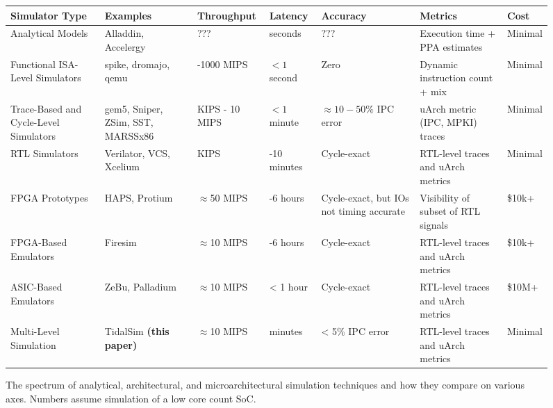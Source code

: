\documentclass[sigplan,nonacm,10pt]{acmart}
\begin{document}
\begin{figure}[!hbt]
  \small
  \begin{tabular}{>{\raggedright\arraybackslash}p{2.5cm}>{\raggedright\arraybackslash}p{2cm}>{\raggedright\arraybackslash}p{2cm}>{\raggedright\arraybackslash}p{2cm}>{\raggedright\arraybackslash}p{2.5cm}>{\raggedright\arraybackslash}p{3cm}>{\raggedright\arraybackslash}p{2cm}}\toprule
  \textbf{Simulator Type} & \textbf{Examples} & \textbf{Throughput} & \textbf{Latency} & \textbf{Accuracy} & \textbf{Metrics} & \textbf{Cost} \\\midrule
  Analytical Models & Alladdin, Accelergy & ??? & seconds & ??? & Execution time + PPA estimates & Minimal \\
  \midrule
  Functional ISA-Level Simulators & spike, dromajo, qemu & 100-1000 MIPS & $<1$ second & Zero & Dynamic instruction count + mix & Minimal \\
  \midrule
  Trace-Based and Cycle-Level Simulators & gem5, Sniper, ZSim, SST, MARSSx86 & 100 KIPS - 10 MIPS & $<1$ minute & $\approx10-50\%$ IPC error & uArch metric (IPC, MPKI) traces & Minimal \\
  \midrule
  RTL Simulators & Verilator, VCS, Xcelium & 10 KIPS & 2-10 minutes & Cycle-exact & RTL-level traces and uArch metrics & Minimal \\
  \midrule
  FPGA Prototypes & HAPS, Protium & $\approx$50 MIPS & 2-6 hours & Cycle-exact, but IOs not timing accurate & Visibility of subset of RTL signals & \$10k+ \\
  \midrule
  FPGA-Based Emulators & Firesim & $\approx$10 MIPS & 2-6 hours & Cycle-exact & RTL-level traces and uArch metrics & \$10k+ \\
  \midrule
  ASIC-Based Emulators & ZeBu, Palladium & $\approx$10 MIPS & < 1 hour & Cycle-exact & RTL-level traces and uArch metrics & \$10M+ \\
  \midrule
  Multi-Level Simulation & TidalSim \textbf{(this paper)} & $\approx$10 MIPS & minutes & < 5\% IPC error & RTL-level traces and uArch metrics & Minimal \\
  \bottomrule
  \end{tabular}
  \caption{The spectrum of analytical, architectural, and microarchitectural simulation techniques and how they compare on various axes. Numbers assume simulation of a low core count SoC.}
  \label{fig:spectrum_of_simulators}
\end{figure}
\end{document}
